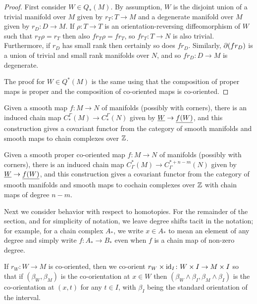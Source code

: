 \begin{proof}
	First consider $W \in Q_*(M)$.
	By assumption, $W$ is the disjoint union of a trivial manifold over $M$ given by $r_T \colon T \to M$ and a degenerate manifold over $M$ given by $r_D:D \to M$.
	If $\rho \colon T \to T$ is an orientation-reversing diffeomorphism of $W$ such that $r_T\rho = r_T$ then also $fr_T\rho = fr_T$, so $fr_T \colon T \to N$ is also trivial.
	Furthermore, if $r_D$ has small rank then certainly so does $fr_D$.
	Similarly, $\partial(fr_D)$ is a union of trivial and small rank manifolds over $N$, and so $fr_D:D \to M$ is degenerate.

	The proof for $W \in Q^*(M)$ is the same using that the composition of proper maps is proper and the composition of co-oriented maps is co-oriented.
\end{proof}

\begin{corollary}\label{C: homology chain map}
	Given a smooth map $f \colon M \to N$ of manifolds (possibly with corners), there is an induced chain map $C_*^\Gamma(M) \to C_*^\Gamma(N)$ given by $\underline{W} \to \underline{f(W)}$, and this construction gives a covariant functor from the category of smooth manifolds and smooth maps to chain complexes over $\mathbb{Z}$.
\end{corollary}

\begin{corollary}
	Given a smooth proper co-oriented map $f \colon M \to N$ of manifolds (possibly with corners), there is an induced chain map $C^*_\Gamma(M) \to C^{*+n-m}_\Gamma(N)$ given by $\underline{W} \to \underline{f(W)}$, and this construction gives a covariant functor from the category of smooth manifolds and smooth maps to cochain complexes over $\mathbb{Z}$ with chain maps of degree $n-m$.
\end{corollary}

Next we consider behavior with respect to homotopies.
For the remainder of the section, and for simplicity of notation, we leave degree shifts tacit in the notation; for example, for a chain complex $A_*$, we write $x \in A_*$ to mean an element of any degree and simply write $f \colon A_* \to B_*$ even when $f$ is a chain map of non-zero degree.

\begin{convention}\label{homotopy product co-orientation convention}
	If $r_W \colon W \to M$ is co-oriented, then we co-orient $r_W \times \mathrm{id}_I \colon W \times I \to M \times I$ so that if $(\beta_W,\beta_M)$ is the co-orientation at $x \in W$ then $(\beta_W \wedge \beta_I,\beta_M \wedge \beta_I)$ is the co-orientation at $(x,t)$ for any $t \in I$, with $\beta_I$ being the standard orientation of the interval.
\end{convention}

